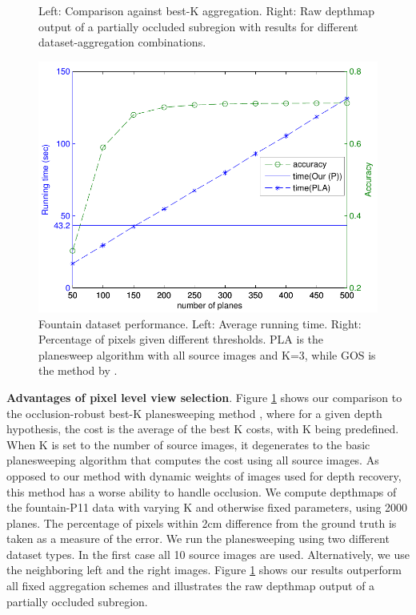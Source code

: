 \begin{figure}
\centering
{}
\caption{Left: Comparison against best-K aggregation. Right: Raw depthmap output of a partially occluded subregion with results for different dataset-aggregation combinations.}
\label{fig:bestK}
\end{figure}

\begin{figure}
\centering
\includegraphics[width=0.7\linewidth]{chapter3/resource/planesweepTiming.pdf}
\caption{Fountain dataset performance. Left: Average running time. Right: Percentage of pixels given different thresholds.  PLA is the planesweep algorithm with all source images and K=3, while GOS is the method by \citet{Goesele07}.}
\label{fig:timing}
\end{figure}

{\bf Advantages of pixel level view selection}. Figure \ref{fig:bestK} shows our comparison to the occlusion-robust best-K planesweeping method \cite{handle_occlusion2001}, where
for a given depth hypothesis, the cost is the average of the best K costs, with K being predefined.
When K is set to the number of source images, it degenerates to the basic planesweeping algorithm that computes the cost using all source images.
As opposed to our method with dynamic weights of images used for depth recovery, this method has a worse ability to handle occlusion.
We compute depthmaps of the fountain-P11 data with varying K and otherwise fixed parameters, using 2000 planes.
The percentage of pixels within 2cm difference from the ground truth is taken as a measure of the error.
We run the planesweeping using two different dataset types. In the first case all 10 source images are used. Alternatively, we use the neighboring left and the right images.
Figure \ref{fig:bestK} shows our results outperform all fixed aggregation schemes and illustrates the raw depthmap output of a partially occluded subregion.



